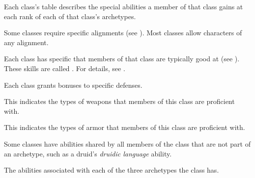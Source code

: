     Each class's table describes the special abilities a member of that class gains at each rank of each of that class's archetypes.

    Some classes require specific alignments (see ).
    Most classes allow characters of any alignment.

    Each class has specific  that members of that class are typically good at (see ).
    These skills are called .
    For details, see .

    Each class grants bonuses to specific defenses.

    This indicates the types of weapons that members of this class are proficient with.

    This indicates the types of armor that members of this class are proficient with.

    Some classes have abilities shared by all members of the class that are not part of an archetype, such as a druid's \textit{druidic language} ability.

    The abilities associated with each of the three archetypes the class has.


